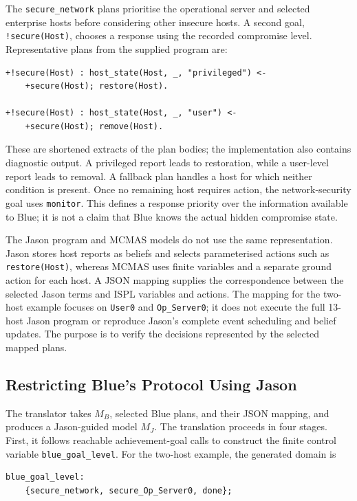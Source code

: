 \documentclass[runningheads]{llncs}
\begin{document}
The \texttt{secure\_network} plans prioritise the operational server and selected enterprise hosts before considering other insecure hosts. A second goal, \texttt{!secure(Host)}, chooses a response using the recorded compromise level. Representative plans from the supplied program are:

\begin{verbatim}
+!secure(Host) : host_state(Host, _, "privileged") <-
    +secure(Host); restore(Host).

+!secure(Host) : host_state(Host, _, "user") <-
    +secure(Host); remove(Host).
\end{verbatim}

These are shortened extracts of the plan bodies; the implementation also contains diagnostic output. A privileged report leads to restoration, while a user-level report leads to removal. A fallback plan handles a host for which neither condition is present. Once no remaining host requires action, the network-security goal uses \texttt{monitor}. This defines a response priority over the information available to Blue; it is not a claim that Blue knows the actual hidden compromise state.

The Jason program and MCMAS models do not use the same representation. Jason stores host reports as beliefs and selects parameterised actions such as \texttt{restore(Host)}, whereas MCMAS uses finite variables and a separate ground action for each host. A JSON mapping supplies the correspondence between the selected Jason terms and ISPL variables and actions. The mapping for the two-host example focuses on \texttt{User0} and \texttt{Op\_Server0}; it does not execute the full 13-host Jason program or reproduce Jason's complete event scheduling and belief updates. The purpose is to verify the decisions represented by the selected mapped plans.

\subsection{Restricting Blue's Protocol Using Jason}

The translator takes $M_B$, selected Blue plans, and their JSON mapping, and produces a Jason-guided model $M_J$. The translation proceeds in four stages. First, it follows reachable achievement-goal calls to construct the finite control variable \texttt{blue\_goal\_level}. For the two-host example, the generated domain is

\begin{verbatim}
blue_goal_level:
    {secure_network, secure_Op_Server0, done};
\end{verbatim}
\end{document}
